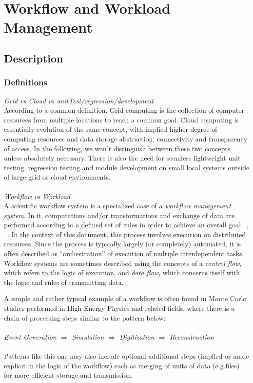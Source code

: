 \section{Workflow and Workload Management}



\subsection{Description}
\subsubsection{Definitions}

\textit{Grid vs Cloud vs unitTest/regression/development}
\\
According to a common definition, Grid computing is the collection of computer resources from multiple locations to reach a common goal. Cloud computing is essentially evolution of the same concept, with implied higher degree of computing resources and data storage abstraction, connectivity and transparency of access. In the following, we won't distinguish between these two concepts unless absolutely necessary.  There is also the need for seemless lightweight unit testing, regression testing and module development on small local systems outside of large grid or cloud environments.
\\
\\
\textit{Workflow vs Workload}
\\
A scientific workflow system is a specialized case of a \textit{workflow management system}. In it, computations and/or transformations and exchange of data are performed according to a defined set of rules in order to achieve an overall goal ~\cite{grid_workflow_taxonomy}, ~\cite{grid_workflow_fit}. In the context of this document, this process involves execution on distributed resources. Since the process is typically largely (or completely) automated, it is often described as ``orchestration'' of execution of multiple interdependent tasks. Workflow systems are sometimes described using the concepts of a \textit{control flow}, which refers to the logic of execution, and \textit{data flow}, which concerns itself with the logic and rules of transmitting data.

A simple and rather typical example of a workflow is often found in Monte Carlo studies performed in High Energy Physics and related fields, where there is a chain of processing steps similar to the pattern below:
\\
\\
\textit{Event  Generation $\Longrightarrow$ Simulation $\Longrightarrow$ Digitization $\Longrightarrow$ Reconstruction}
\\
\\
Patterns like this one may also include optional additional steps (implied or made explicit in the logic of the workflow) such as merging of units of data (e.g.files) for more efficient storage and transmission.

